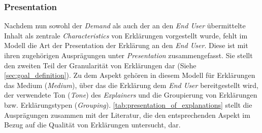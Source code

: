 \subsubsection{Presentation}

Nachdem nun sowohl der \textit{Demand} als auch der an den \textit{End User} übermittelte Inhalt als zentrale \textit{Characteristics} von Erklärungen vorgestellt wurde, fehlt im Modell die Art der Presentation der Erklärung an den \textit{End User}. Diese ist mit ihren zugehörigen Ausprägungen unter \textit{Presentation} zusammengefasst. Sie stellt den zweiten Teil der Granularität von Erklärungen dar (Siehe \autoref{sec:goal_definition}). Zu dem Aspekt gehören in diesem Modell für Erklärungen das Medium (\textit{Medium}), über das die Erklärung dem \textit{End User} bereitgestellt wird, der verwendete Ton (\textit{Tone}) des \textit{Explainers} \cite[vgl.][]{chazette_knowledge_nodate} und die Groupierung von Erklärungen bzw. Erklärungstypen (\textit{Grouping}). \autoref{tab:presentation_of_explanations} stellt die Ausprägungen zusammen mit der Literatur, die den entsprechenden Aspekt im Bezug auf die Qualität von Erklärungen untersucht, dar.

